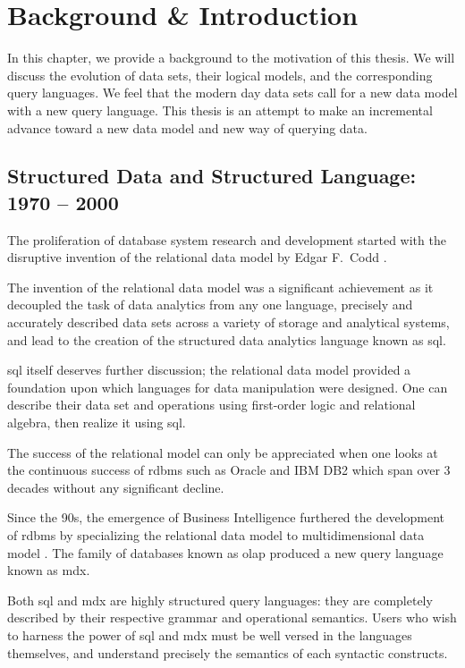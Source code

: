 \chapter{Background \& Introduction}
	In this chapter, we provide a background to the motivation of this thesis.  We will discuss the evolution of data sets, their logical models, and the corresponding query languages.  We feel that the modern day data sets call for a new data model with a new query language.  This thesis is an attempt to make an incremental advance toward a new data model and new way of querying data.

	\section{Structured Data and Structured Language:  1970 -- 2000}
		The proliferation of database system research and development started with the disruptive invention of the relational data model by Edgar F.~Codd \cite{codd-79}.
		
		The invention of the relational data model was a significant achievement as it decoupled the task of data analytics from any one language, precisely and accurately described data sets across a variety of storage and analytical systems, and lead to the creation of the structured data analytics language known as \gls{sql}.
		
		\gls{sql} itself deserves further discussion; the relational data model provided a foundation upon which languages for data manipulation were designed.  One can describe their data set and operations using first-order logic and relational algebra, then realize it using \gls{sql}.
		
		The success of the relational model can only be appreciated when one looks at the continuous success of \gls{rdbms} such as Oracle and IBM DB2 which span over 3 decades without any significant decline.
		
		Since the 90s, the emergence of Business Intelligence \cite{bikm-02} furthered the development of \gls{rdbms} by specializing the relational data model to multidimensional data model \cite{colliat-96}.  The family of databases known as \gls{olap} produced a new query language known as \gls{mdx}.
		
		Both \gls{sql} and \gls{mdx} are highly structured query languages: they are completely described by their respective grammar and operational semantics.  Users who wish to harness the power of \gls{sql} and \gls{mdx} must be well versed in the languages themselves, and understand precisely the semantics of each syntactic constructs.
		

